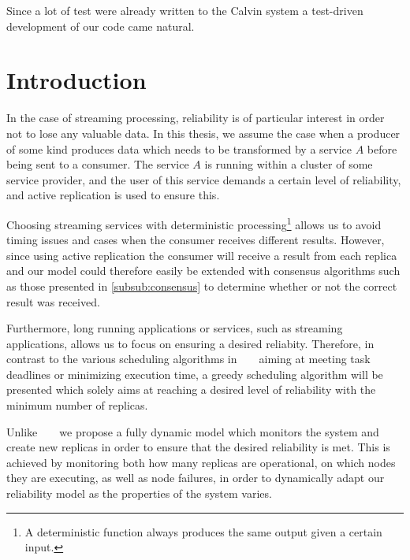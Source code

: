 \documentclass{cslthse-msc}
\begin{document}
Since a lot of test were already written to the Calvin system a test-driven development of our code came natural.

\section{Introduction} \label{sec:design_intro}
In the case of streaming processing, reliability is of particular interest in order not to lose any valuable data. In this thesis, we assume the case when a producer of some kind produces data which needs to be transformed by a service $A$ before being sent to a consumer. The service $A$ is running within a cluster of some service provider, and the user of this service demands a certain level of reliability, and active replication is used to ensure this.

Choosing streaming services with deterministic processing\footnote{A deterministic function always produces the same output given a certain input.} allows us to avoid timing issues and cases when the consumer receives different results. However, since using active replication the consumer will receive a result from each replica and our model could therefore easily be extended with consensus algorithms such as those presented in \autoref{subsub:consensus} to determine whether or not the correct result was received. 

Furthermore, long running applications or services, such as streaming applications, allows us to focus on ensuring a desired reliabity. Therefore, in contrast to the various scheduling algorithms in ~\cite{algoOptTimeMaxRel} \cite{optTaskAllocationForMaxRel} \cite{taskAllocation} \cite{taskAllocationSwarm} \cite{algoMaxRelEndToEndConstraint} \cite{algoMinExTime} ~\cite{schedReplicas} aiming at meeting task deadlines or minimizing execution time, a greedy scheduling algorithm will be presented which solely aims at reaching a desired level of reliability with the minimum number of replicas.

Unlike ~\cite{designFaultTolerantSched}  \cite{evalReplicationSched} \cite{taskSchedulingReplication} \cite{effTaskReplMobGrid} ~\cite{relGridServicePredConstraint} we propose a fully dynamic model which monitors the system and create new replicas in order to ensure that the desired reliability is met. This is achieved by monitoring both how many replicas are operational, on which nodes they are executing, as well as node failures, in order to dynamically adapt our reliability model as the properties of the system varies.
\end{document}
